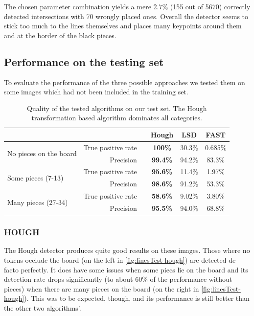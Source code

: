 	The chosen parameter combination yields a mere 2.7\% (155 out of 5670) correctly detected intersections with 70 wrongly placed ones. Overall the detector seems to stick too much to the lines themselves and places many keypoints around them and at the border of the black pieces.

	\subsection{Performance on the testing set}
	\label{evaluation-visible-performance}
	To evaluate the performance of the three possible approaches we tested them on some images which had not been included in the training set.

	\begin{table}[b!]
		\begin{tabular}{lrc>{\bfseries}ccc}
		    \multicolumn{2}{c}{}									&\hphantom{Abst} & Hough 	& LSD 		& FAST     \\

			\toprule
			\multirow{2}{*}{No pieces on the board}   		& True positive rate 	&& 100\%	& 30.3\%  	& 0.685\%  \\
															& Precision			 	&& 99.4\% 	& 94.2\%  	& 83.3\%  \\
			\midrule
			\multirow{2}{*}{Some pieces (7-13)}				& True positive rate 	&& 95.6\% 	& 11.4\% 	& 1.97\%   \\
															& Precision 			&& 98.6\% 	& 91.2\%  	& 53.3\%  \\
			\midrule
			\multirow{2}{*}{Many pieces (27-34)} 			& True positive rate 	&& 58.6\% 	& 9.02\% 	& 3.80\%   \\
															& Precision			 	&& 95.5\% 	& 94.0\%  	& 68.8\%  \\
			\bottomrule
		\end{tabular}
		\caption{Quality of the tested algorithms on our test set. The Hough transformation based algorithm dominates all categories.}
		\label{tab:linesTest}
	\end{table}

	\subsubsection{HOUGH}
	\label{evaluation-visible-performance-hough}
	The Hough detector produces quite good results on these images. Those where no tokens occlude the board (on the left in \autoref{fig:linesTest-hough}) are detected de facto perfectly. It does have some issues when some piecs lie on the board and its detection rate drops significantly (to about 60\% of the performance without pieces) when there are many pieces on the board (on the right in \autoref{fig:linesTest-hough}). This was to be expected, though, and its performance is still better than the other two algorithms'.

